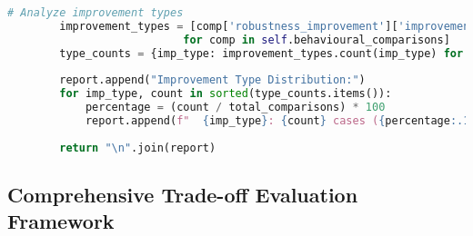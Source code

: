 \begin{lstlisting}[language=Python, caption=Systematic Failure Mode Documentation and Recovery Analysis]
        # Analyze improvement types
        improvement_types = [comp['robustness_improvement']['improvement_type'] 
                           for comp in self.behavioural_comparisons]
        type_counts = {imp_type: improvement_types.count(imp_type) for imp_type in set(improvement_types)}
        
        report.append("Improvement Type Distribution:")
        for imp_type, count in sorted(type_counts.items()):
            percentage = (count / total_comparisons) * 100
            report.append(f"  {imp_type}: {count} cases ({percentage:.1f}%)")
        
        return "\n".join(report)
\end{lstlisting}

\subsection{Comprehensive Trade-off Evaluation Framework}
\label{appendix:comprehensive-evaluation}

